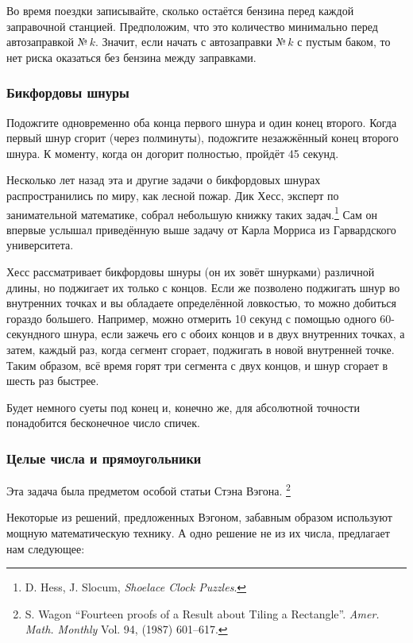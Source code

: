 Во время поездки записывайте, сколько остаётся бензина перед каждой заправочной станцией.
Предположим, что это количество минимально перед автозаправкой №\,$k$.
Значит, если начать с автозаправки №\,$k$ с пустым баком, то нет риска оказаться без бензина между заправками.
\heart

\subsubsection*{Бикфордовы шнуры} %

Подожгите одновременно оба конца первого шнура и один конец второго.
Когда первый шнур сгорит (через полминуты), подожгите незажжённый конец второго шнура.
К моменту, когда он догорит полностью, пройдёт 45 секунд.
\heart

Несколько лет назад эта и другие задачи о бикфордовых шнурах распространились по миру, как лесной пожар.
Дик Хесс, эксперт по занимательной математике, 
собрал небольшую книжку таких задач.\footnote{D. Hess, J. Slocum, \emph{Shoelace Clock Puzzles}.}
Сам он впервые услышал приведённую выше задачу от Карла Морриса из Гарвардского университета.

Хесс рассматривает бикфордовы шнуры (он их зовёт шнурками) различной длины, но поджигает их только с концов.
Если же позволено поджигать шнур во внутренних точках и вы обладаете определённой ловкостью, то можно добиться гораздо большего.
Например, можно отмерить 10 секунд с помощью одного 60-секундного шнура, если зажечь его с обоих концов и в двух внутренних точках, а затем, каждый раз, когда сегмент сгорает, поджигать в новой внутренней точке.
Таким образом, всё время горят три сегмента с двух концов, и шнур сгорает в шесть раз быстрее.

Будет немного суеты под конец и, конечно же, для абсолютной точности
понадобится бесконечное число спичек.

\subsubsection*{Целые числа и прямоугольники} %

Эта задача была предметом особой 
статьи Стэна Вэгона.%
\footnote{S. Wagon ``Fourteen proofs of a Result about Tiling a Rectangle''. \emph{Amer. Math. Monthly} Vol. 94, (1987) 601--617.}

Некоторые из решений, предложенных Вэгоном, забавным образом используют мощную математическую технику.
А одно решение не из их числа, предлагает нам следующее:

